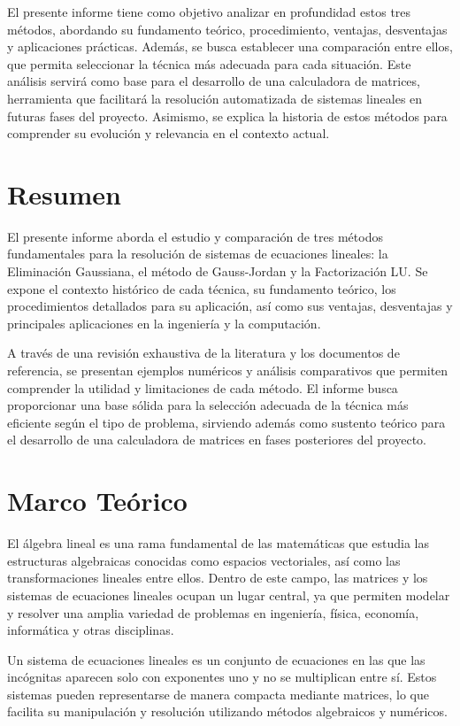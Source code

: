 \documentclass[12pt]{article}
\begin{document}
El presente informe tiene como objetivo analizar en profundidad estos tres métodos, abordando su fundamento teórico, procedimiento, ventajas, desventajas y aplicaciones prácticas. Además, se busca establecer una comparación entre ellos, que permita seleccionar la técnica más adecuada para cada situación. Este análisis servirá como base para el desarrollo de una calculadora de matrices, herramienta que facilitará la resolución automatizada de sistemas lineales en futuras fases del proyecto. Asimismo, se explica la historia de estos métodos para comprender su evolución y relevancia en el contexto actual.

\section{Resumen}
El presente informe aborda el estudio y comparación de tres métodos fundamentales para la resolución de sistemas de ecuaciones lineales: la Eliminación Gaussiana, el método de Gauss-Jordan y la Factorización LU. Se expone el contexto histórico de cada técnica, su fundamento teórico, los procedimientos detallados para su aplicación, así como sus ventajas, desventajas y principales aplicaciones en la ingeniería y la computación.

A través de una revisión exhaustiva de la literatura y los documentos de referencia, se presentan ejemplos numéricos y análisis comparativos que permiten comprender la utilidad y limitaciones de cada método. El informe busca proporcionar una base sólida para la selección adecuada de la técnica más eficiente según el tipo de problema, sirviendo además como sustento teórico para el desarrollo de una calculadora de matrices en fases posteriores del proyecto.

\section{Marco Teórico}
El álgebra lineal es una rama fundamental de las matemáticas que estudia las estructuras algebraicas conocidas como espacios vectoriales, así como las transformaciones lineales entre ellos. Dentro de este campo, las matrices y los sistemas de ecuaciones lineales ocupan un lugar central, ya que permiten modelar y resolver una amplia variedad de problemas en ingeniería, física, economía, informática y otras disciplinas.

Un sistema de ecuaciones lineales es un conjunto de ecuaciones en las que las incógnitas aparecen solo con exponentes uno y no se multiplican entre sí. Estos sistemas pueden representarse de manera compacta mediante matrices, lo que facilita su manipulación y resolución utilizando métodos algebraicos y numéricos.
\end{document}
